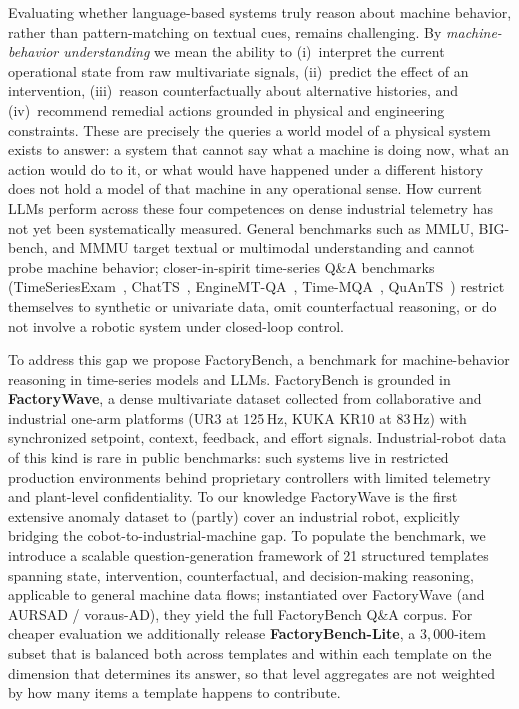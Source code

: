 Evaluating whether language-based systems truly reason about machine behavior, rather than pattern-matching on textual cues, remains challenging. By \emph{machine-behavior understanding} we mean the ability to (i)~interpret the current operational state from raw multivariate signals, (ii)~predict the effect of an intervention, (iii)~reason counterfactually about alternative histories, and (iv)~recommend remedial actions grounded in physical and engineering constraints. These are precisely the queries a world model of a physical system exists to answer: a system that cannot say what a machine is doing now, what an action would do to it, or what would have happened under a different history does not hold a model of that machine in any operational sense. How current LLMs perform across these four competences on dense industrial telemetry has not yet been systematically measured. General benchmarks such as MMLU, BIG-bench, and MMMU \cite{hendrycks2021mmlu,srivastava2023bigbench,yue2024mmmu} target textual or multimodal understanding and cannot probe machine behavior; closer-in-spirit time-series Q\&A benchmarks (TimeSeriesExam~\cite{cai2024timeseriesexamtimeseriesunderstanding}, ChatTS~\cite{Xie_2025}, EngineMT-QA~\cite{wang2025itformerbridgingtimeseries}, Time-MQA~\cite{kong2025timemqatimeseriesmultitask}, QuAnTS~\cite{wenkel2024quants}) restrict themselves to synthetic or univariate data, omit counterfactual reasoning, or do not involve a robotic system under closed-loop control.

To address this gap we propose FactoryBench, a benchmark for machine-behavior reasoning in time-series models and LLMs. FactoryBench is grounded in \textbf{FactoryWave}, a dense multivariate dataset collected from collaborative and industrial one-arm platforms (UR3 at 125\,Hz, KUKA KR10 at 83\,Hz) with synchronized setpoint, context, feedback, and effort signals. Industrial-robot data of this kind is rare in public benchmarks: such systems live in restricted production environments behind proprietary controllers with limited telemetry and plant-level confidentiality. To our knowledge FactoryWave is the first extensive anomaly dataset to (partly) cover an industrial robot, explicitly bridging the cobot-to-industrial-machine gap. To populate the benchmark, we introduce a scalable question-generation framework of 21 structured templates spanning state, intervention, counterfactual, and decision-making reasoning, applicable to general machine data flows; instantiated over FactoryWave (and AURSAD / voraus-AD), they yield the full FactoryBench Q\&A corpus. For cheaper evaluation we additionally release \textbf{FactoryBench-Lite}, a $3{,}000$-item subset that is balanced both across templates and within each template on the dimension that determines its answer, so that level aggregates are not weighted by how many items a template happens to contribute.


